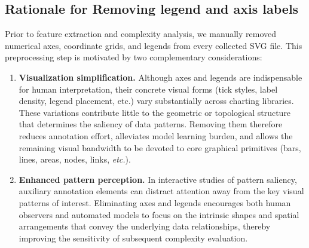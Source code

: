 \documentclass[journal]{IEEEtran}
\begin{document}
% 

\subsection{Rationale for Removing legend and axis labels}
Prior to feature extraction and complexity analysis, we manually removed numerical axes, coordinate grids, and legends from every collected SVG file. This preprocessing step is motivated by two complementary considerations:

\begin{enumerate}
    \item \textbf{Visualization simplification.} Although axes and legends are indispensable for human interpretation, their concrete visual forms (tick styles, label density, legend placement, etc.) vary substantially across charting libraries. These variations contribute little to the geometric or topological structure that determines the saliency of data patterns. Removing them therefore reduces annotation effort, alleviates model learning burden, and allows the remaining visual bandwidth to be devoted to core graphical primitives (bars, lines, areas, nodes, links, \emph{etc.}).
    \item \textbf{Enhanced pattern perception.} In interactive studies of pattern saliency, auxiliary annotation elements can distract attention away from the key visual patterns of interest. Eliminating axes and legends encourages both human observers and automated models to focus on the intrinsic shapes and spatial arrangements that convey the underlying data relationships, thereby improving the sensitivity of subsequent complexity evaluation.
\end{enumerate}
\end{document}
